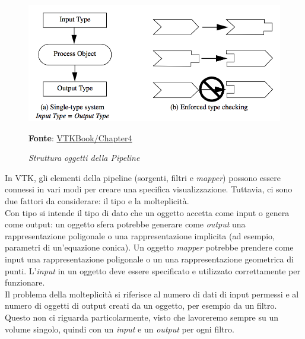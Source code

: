 \begin{figure}[h]
    \centering
    \includegraphics[scale=0.35]{immagini/volumerendering/pipeline.png}
    \caption{\textit{Struttura oggetti della Pipeline}}
    \textbf{Fonte}: \href{https://lorensen.github.io/VTKExamples/site/VTKBook/04Chapter4/}{VTKBook/Chapter4}
    \label{fig: Struttura Pipeline}
\end{figure}

In VTK, gli elementi della pipeline (sorgenti, filtri e \emph{mapper}) possono essere connessi in vari modi per creare una specifica visualizzazione. Tuttavia, ci sono due fattori da considerare: il tipo e la molteplicità.\\
Con tipo si intende il tipo di dato che un oggetto accetta come input o genera come output: un oggetto sfera potrebbe generare come \emph{output} una rappresentazione poligonale o una rappresentazione implicita (ad esempio, parametri di un'equazione conica). Un oggetto \emph{mapper} potrebbe prendere come input una rappresentazione poligonale o un una rappresentazione geometrica di punti. L'\emph{input} in un oggetto deve essere specificato e utilizzato correttamente per funzionare.
\\
Il problema della molteplicità si riferisce al numero di dati di input permessi e al numero di oggetti di output creati da un oggetto, per esempio da un filtro. Questo non ci riguarda particolarmente, visto che lavoreremo sempre su un volume singolo, quindi con un \emph{input} e un \emph{output} per ogni filtro.

